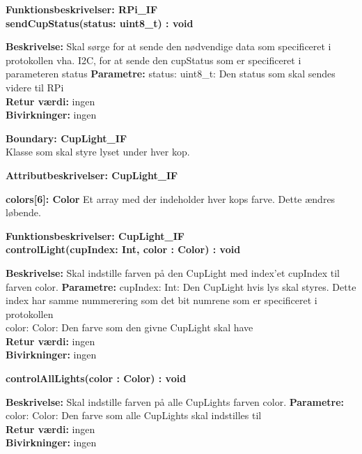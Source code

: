 \documentclass[Arkitektur/System_main.tex]{subfiles}
\begin{document}
{\large\textbf{Funktionsbeskrivelser: RPi\_IF}}\\[0.2cm]
\textbf{sendCupStatus(status: uint8\_t) : void}
\begin{adjustwidth}{1cm}{0pt}
\textbf{Beskrivelse:} Skal sørge for at sende den nødvendige data som specificeret i protokollen vha. I2C, for at sende den cupStatus som er specificeret i parameteren status
\textbf{Parametre:} status: uint8\_t: Den status som skal sendes videre til RPi \\[0.2cm]
\textbf{Retur værdi:} ingen \\[0.2cm]
\textbf{Bivirkninger:} ingen \\[0.2cm]
\end{adjustwidth}

{\large\textbf{Boundary:  CupLight\_IF}}\\
Klasse som skal styre lyset under hver kop.

{\large\textbf{Attributbeskrivelser: CupLight\_IF}}
\begin{adjustwidth}{1cm}{0pt}
\textbf{colors[6]: Color } Et array med der indeholder hver kops farve. Dette ændres løbende. \\[0.2cm]
\end{adjustwidth}
{\large\textbf{Funktionsbeskrivelser: CupLight\_IF}}\\[0.2cm]
\textbf{controlLight(cupIndex: Int, color : Color) : void}
\begin{adjustwidth}{1cm}{0pt}
\textbf{Beskrivelse:} Skal indstille farven på den CupLight med index'et cupIndex til farven color.
\textbf{Parametre:}  cupIndex: Int: Den CupLight hvis lys skal styres. Dette index har samme nummerering som det bit numrene som er specificeret i protokollen\\color: Color: Den farve som den givne CupLight skal have \\[0.2cm]
\textbf{Retur værdi:} ingen \\[0.2cm]
\textbf{Bivirkninger:} ingen \\[0.2cm]
\end{adjustwidth}
\textbf{controlAllLights(color : Color) : void}
\begin{adjustwidth}{1cm}{0pt}
\textbf{Beskrivelse:} Skal indstille farven på alle CupLights farven color.
\textbf{Parametre:} color: Color: Den farve som alle CupLights skal indstilles til \\[0.2cm]
\textbf{Retur værdi:} ingen \\[0.2cm]
\textbf{Bivirkninger:} ingen \\[0.2cm]
\end{adjustwidth}
\end{document}

